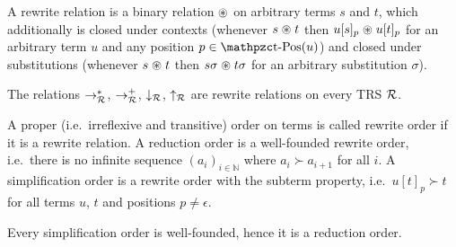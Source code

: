 %
\begin{definition}\label{def:closed-under}
	A {\myem rewrite relation} is a binary relation 
	$\mathrel{\circledast}$ on arbitrary terms $s$ and $t$, 
	which additionally is {\myem closed under contexts} 
	(whenever $s\mathrel{\circledast} t$ then $u[s]_p\mathrel{\circledast} u[t]_p$ 
	for an arbitrary term $u$ and any position $p\in\pos(u)$)
	and {\myem closed under substitutions} 
	(whenever $s\mathrel{\circledast} t$ then $s\sigma\mathrel{\circledast} t\sigma$
	for an arbitrary substitution $\sigma$).
\end{definition}
\begin{lemma}
	The relations $\rightarrow^*_{\mathcal R}$, 
	$\rightarrow^+_{\mathcal R}$,
	$\downarrow_{\mathcal R}$, $\uparrow_{\mathcal R}$ are rewrite relations on every TRS ${\mathcal R}$.
\end{lemma}
\begin{definition}
	A proper (i.e.~irreflexive and transitive) order on terms is called {\myem rewrite order} if it is a rewrite relation.
	A {\myem reduction order} is a well-founded rewrite order,
	i.e.~there is no infinite sequence 
	$(a_i)_{i\in\mathbb{N}}$
	where $a_i\succ a_{i+1}$ for all $i$.
	A {\myem simplification order} is a rewrite order with the {\myem subterm property},
	i.e.~$u[t]_p \succ t$ for all terms $u$, $t$ and positions $p\neq\epsilon$.
\end{definition}
\begin{lemma}
	Every simplification order is well-founded, hence it is a reduction order.
\end{lemma}



